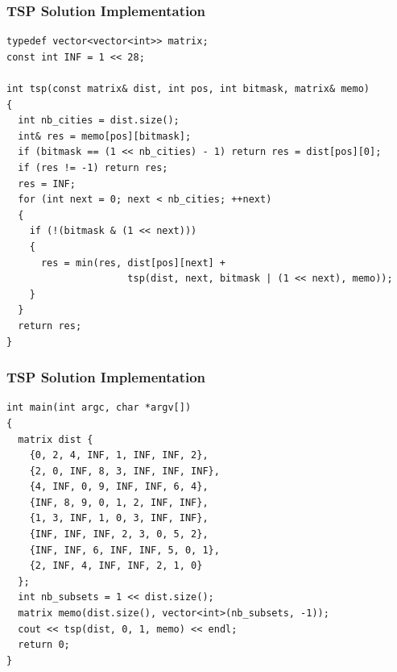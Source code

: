 \documentclass{beamer}
\newcounter{exo}
\newcommand{\exo}{
  \addtocounter{exo}{1}
  Exercice \arabic{exo}
}
\begin{document}

\begin{frame}[containsverbatim]
\frametitle{TSP Solution Implementation}

\scriptsize
\begin{lstlisting}
typedef vector<vector<int>> matrix;
const int INF = 1 << 28;

int tsp(const matrix& dist, int pos, int bitmask, matrix& memo)
{
  int nb_cities = dist.size();
  int& res = memo[pos][bitmask];
  if (bitmask == (1 << nb_cities) - 1) return res = dist[pos][0];
  if (res != -1) return res;
  res = INF;
  for (int next = 0; next < nb_cities; ++next)
  {
    if (!(bitmask & (1 << next)))
    {
      res = min(res, dist[pos][next] +
                     tsp(dist, next, bitmask | (1 << next), memo));
    }
  }
  return res;
}
\end{lstlisting}

\end{frame}

\begin{frame}[containsverbatim]
\frametitle{TSP Solution Implementation}

\scriptsize
\begin{lstlisting}
int main(int argc, char *argv[])
{
  matrix dist {
    {0, 2, 4, INF, 1, INF, INF, 2},
    {2, 0, INF, 8, 3, INF, INF, INF},
    {4, INF, 0, 9, INF, INF, 6, 4},
    {INF, 8, 9, 0, 1, 2, INF, INF},
    {1, 3, INF, 1, 0, 3, INF, INF},
    {INF, INF, INF, 2, 3, 0, 5, 2},
    {INF, INF, 6, INF, INF, 5, 0, 1},
    {2, INF, 4, INF, INF, 2, 1, 0}
  };
  int nb_subsets = 1 << dist.size();
  matrix memo(dist.size(), vector<int>(nb_subsets, -1));
  cout << tsp(dist, 0, 1, memo) << endl;
  return 0;
}
\end{lstlisting}

\end{frame}

\end{document}
